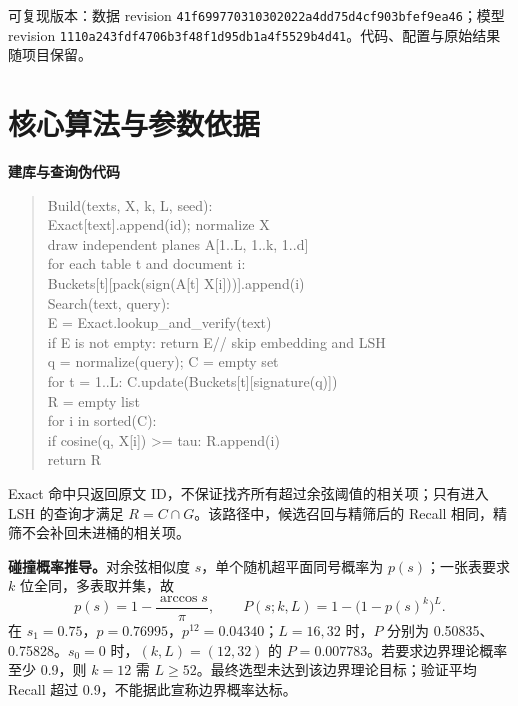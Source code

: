 \documentclass[UTF8,fontset=fandol,a4paper,10pt]{ctexart}
\begin{document}
\vfill
{\footnotesize\noindent 可复现版本：数据 revision \texttt{41f699770310302022a4dd75d4cf903bfef9ea46}；模型 revision \texttt{1110a243fdf4706b3f48f1d95db1a4f5529b4d41}。代码、配置与原始结果随项目保留。}

\newpage
\section{核心算法与参数依据}
\noindent\textbf{建库与查询伪代码}\par
\begin{quote}\small\ttfamily
Build(texts, X, k, L, seed):\\
\hspace*{1em}Exact[text].append(id); normalize X\\
\hspace*{1em}draw independent planes A[1..L, 1..k, 1..d]\\
\hspace*{1em}for each table t and document i:\\
\hspace*{2em}Buckets[t][pack(sign(A[t] X[i]))].append(i)\\[3pt]
Search(text, query):\\
\hspace*{1em}E = Exact.lookup\_and\_verify(text)\\
\hspace*{1em}if E is not empty: return E\quad // skip embedding and LSH\\
\hspace*{1em}q = normalize(query); C = empty set\\
\hspace*{1em}for t = 1..L: C.update(Buckets[t][signature(q)])\\
\hspace*{1em}R = empty list\\
\hspace*{1em}for i in sorted(C):\\
\hspace*{2em}if cosine(q, X[i]) >= tau: R.append(i)\\
\hspace*{1em}return R
\end{quote}
Exact 命中只返回原文 ID，不保证找齐所有超过余弦阈值的相关项；只有进入 LSH 的查询才满足 $R=C\cap G$。该路径中，候选召回与精筛后的 Recall 相同，精筛不会补回未进桶的相关项。

\textbf{碰撞概率推导。}对余弦相似度 $s$，单个随机超平面同号概率为 $p(s)$；一张表要求 $k$ 位全同，多表取并集，故
\[
 p(s)=1-\frac{\arccos s}{\pi},\qquad
 P(s;k,L)=1-\bigl(1-p(s)^k\bigr)^L.
\]
在 $s_1=0.75$，$p=0.76995$，$p^{12}=0.04340$；$L=16,32$ 时，$P$ 分别为 0.50835、0.75828。$s_0=0$ 时，$(k,L)=(12,32)$ 的 $P=0.007783$。若要求边界理论概率至少 0.9，则 $k=12$ 需 $L\ge52$。最终选型未达到该边界理论目标；验证平均 Recall 超过 0.9，不能据此宣称边界概率达标。
\end{document}
